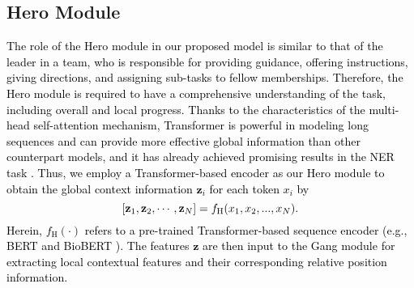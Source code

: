 \documentclass[11pt]{article}
\begin{document}
\subsection{Hero Module}
\textcolor{black}{
\textcolor{black}{The role of the Hero module in our proposed model is similar to that of the leader in a team, who is responsible for providing guidance, offering instructions, giving directions, and assigning sub-tasks to fellow memberships. Therefore, the Hero module is required to have a comprehensive understanding of the task, including overall and local progress.}
Thanks to the characteristics of the multi-head self-attention mechanism, Transformer is powerful in modeling long sequences and can provide more effective global information than other counterpart models, and it has already achieved promising results in the NER task \cite{luo2020hierarchical,beltagy2019scibert}. 
Thus, we employ a Transformer-based encoder as our Hero module to obtain the global context information $\mathbf{z}_{i}$ for each token $x_{i}$ by
\begin{equation}
\setlength\abovedisplayskip{6pt}
\setlength\belowdisplayskip{6pt}
    [\mathbf{z}_{1},\mathbf{z}_{2},\cdots,\mathbf{z}_{N}] = f_\text{H} (x_{1},x_{2},...,x_{N}).
\end{equation}
Herein, $f_\text{H} (\cdot)$ refers to a pre-trained Transformer-based sequence encoder (e.g., BERT \cite{BERT} and BioBERT \cite{biobert}).
}
\textcolor{black}{The features $\mathbf{z}$ are then input to the Gang module for extracting local contextual features and their corresponding relative position information.}
\end{document}
